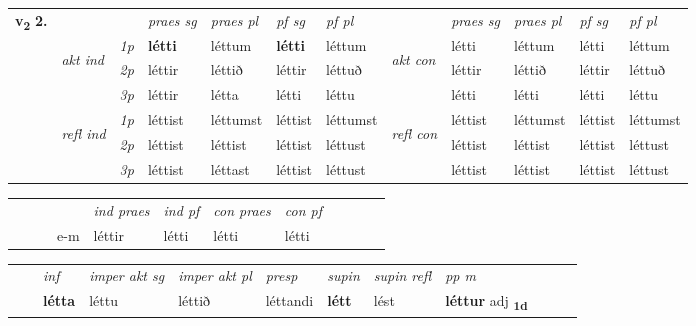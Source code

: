 \begin{tabular}{llllllllllll} \toprule
\multirow{4}{*}{{{\textbf{v{\textsubscript{2}}} \Large{\textbf{2.}}}}}  & &   &  \textit{praes sg}  & \textit{praes pl}  &\textit{ pf sg} & \textit{pf pl} &  &  \textit{praes sg}  & \textit{praes pl}  & \textit{pf sg} & \textit{pf pl } \\*
	\cmidrule{4-7} \cmidrule{9-12}
 & \multirow{3}{*}{\begin{turn}{90}\textit{akt ind}\end{turn}} & {\textit{1p}} & \textbf{létti} & léttum    & \textbf{létti} & léttum & \multirow{3}{*}{\begin{turn}{90}\textit{akt con}\end{turn}} &létti & léttum & létti & léttum\\*
& &  {\textit{2p}} &  léttir  & léttið   & léttir & léttuð & & léttir & léttið & léttir & léttuð \\*
& &  {\textit{3p}} & léttir & létta   & létti & léttu & & létti & létti& létti & léttu  \\*
\cmidrule{4-7} \cmidrule{9-12}
 &\multirow{3}{*}{\begin{turn}{90}\textit{refl ind}\end{turn}} & {\textit{1p}} & léttist & léttumst    & léttist & léttumst & \multirow{3}{*}{\begin{turn}{90}\textit{refl con}\end{turn}}  &léttist & léttumst & léttist & léttumst\\*
 &&  {\textit{2p}} &  léttist  & léttist   & léttist & léttust & &léttist & léttist & léttist & léttust \\*
& &  {\textit{3p}} & léttist & léttast   & léttist & léttust & & léttist & léttist& léttist & léttust  \\*
\cmidrule{4-7} \cmidrule{9-12}
\end{tabular}


\begin{tabular}{llllllllllll}
 & &  & &  \textit{ind praes} & \textit{ind pf} & \textit{con praes} & \textit{con pf} \\*
&  & & e-m & léttir & létti & létti & létti \\*
\cmidrule{5-9}
\end{tabular}


\begin{tabular}{llllllllllll}
 & & \textit{inf} & \textit{imper akt sg} & \textit{imper akt pl}   & \textit{presp} & \textit{supin} & \textit{supin refl} & \textit{pp m}     \\*
  & & \textbf{létta} & léttu  & léttið   & léttandi &  \textbf{létt} & lést & \textbf{léttur} adj \textbf{\textsubscript{1d}} \\*
\cmidrule{1-12}
\end{tabular}



